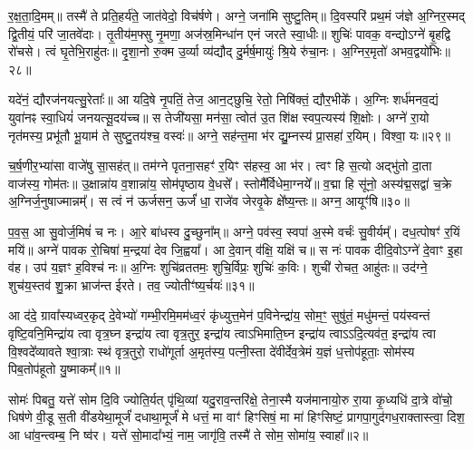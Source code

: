 र॒क्ष॒ता॒दि॒मम्॥ तस्मै॑ ते प्रति॒हर्य॑ते॒ जात॑वेदो॒ विच॑र्\mbox{}षणे। अग्ने॒ जना॑मि सुष्टु॒तिम्॥ दि॒वस्परि॑ प्रथ॒मं ज॑ज्ञे अ॒ग्निर॒स्मद् द्वि॒तीयं॒ परि॑ जा॒तवे॑दाः। तृ॒तीय॑म॒फ्सु नृ॒मणा॒ अज॑स्र॒मिन्धा॑न एनं जरते स्वा॒धीः॥ शुचिः॑ पावक॒ वन्द्यो\-ऽग्ने॑ बृ॒हद्वि रो॑चसे। त्वं घृ॒तेभि॒राहु॑तः॥ दृ॒शा॒नो रु॒क्म उ॒र्व्या व्य॑द्यौद् दु॒र्मर्\mbox{}ष॒मायुः॑ श्रि॒ये रु॑चा॒नः। अ॒ग्निर॒मृतो॑ अभव॒द्वयो॑भिः॥२८॥

यदे॑नं॒ द्यौरज॑नयत्सु॒रेताः᳚॥ आ यदि॒षे नृ॒पतिं॒ तेज॒ आन॒ट्छुचि॒ रेतो॒ निषि॑क्तं॒ द्यौर॒भीके᳚। अ॒ग्निः शर्ध॑मनव॒द्यं युवा॑नꣴ स्वा॒धियं॑ जनयत्सू॒दय॑च्च॥ स तेजी॑यसा॒ मन॑सा॒ त्वोत॑ उ॒त शि॑क्ष स्वप॒त्यस्य॑ शि॒क्षोः। अग्ने॑ रा॒यो नृत॑मस्य॒ प्रभू॑तौ भू॒याम॑ ते सुष्टु॒तय॑श्च॒ वस्वः॑॥ अग्ने॒ सह॑न्त॒मा भ॑र द्यु॒म्नस्य॑ प्रा॒सहा॑ र॒यिम्। विश्वा॒ यः॥२९॥

च॒र्\mbox{}ष॒णीर॒भ्या॑सा वाजे॑षु सा॒सह॑त्॥ तम॑ग्ने पृतना॒सहꣳ॑ र॒यिꣳ स॑हस्व॒ आ भ॑र। त्वꣳ हि स॒त्यो अद्भु॑तो दा॒ता वाज॑स्य॒ गोम॑तः॥ उ॒क्षान्ना॑य व॒शान्ना॑य॒ सोम॑पृष्ठाय वे॒धसे᳚। स्तोमै᳚र्विधेमा॒ग्नये᳚॥ व॒द्मा हि सू॑नो॒ अस्य॑द्म॒सद्वा॑ च॒क्रे अ॒ग्निर्ज॒नुषाज्मान्नम्᳚। स त्वं न॑ ऊर्जसन॒ ऊर्जं॑ धा॒ राजे॑व जेरवृ॒के क्षे᳚ष्य॒न्तः॥ अग्न॒ आयूꣳ॑षि॥३०॥

प॒व॒स॒ आ सु॒वोर्ज॒मिषं॑ च नः। आ॒रे बा॑धस्व दु॒च्छुना᳚म्॥ अग्ने॒ पव॑स्व॒ स्वपा॑ अ॒स्मे वर्चः॑ सु॒वीर्यम्᳚। दध॒त्पोषꣳ॑ र॒यिं मयि॑॥ अग्ने॑ पावक रो॒चिषा॑ म॒न्द्रया॑ देव जि॒ह्वया᳚। आ दे॒वान् व॑क्षि॒ यक्षि॑ च॥ स नः॑ पावक दीदि॒वो\-ऽग्ने॑ दे॒वाꣳ इ॒हा व॑ह। उप॑ य॒ज्ञꣳ ह॒विश्च॑ नः॥ अ॒ग्निः शुचि॑व्रततमः॒ शुचि॒र्विप्रः॒ शुचिः॑ क॒विः। शुची॑ रोचत॒ आहु॑तः॥ उद॑ग्ने॒ शुच॑य॒स्तव॑ शु॒क्रा भ्राज॑न्त ईरते। तव॒ ज्योतीꣳ॑ष्य॒र्चयः॑॥३१॥

{\anuvakamend[{पु॒रु॒नि॒ष्ठः पु॑र्वणीक भरा॒\-ऽभि वयो॑भि॒र्य आयूꣳ॑षि॒ विप्रः॒ शुचि॒श्चतु॑र्दश च॥14॥}]}

\setcounter{anuvakam}{0}
आ द॑दे॒ ग्रावा᳚स्यध्वर॒कृद् दे॒वेभ्यो॑ गम्भी॒रमि॒मम॑ध्व॒रं कृ॑ध्युत्त॒मेन॑ प॒विनेन्द्रा॑य॒ सोम॒ꣳ॒ सुषु॑तं॒ मधु॑मन्तं॒ पय॑स्वन्तं वृष्टि॒वनि॒मिन्द्रा॑य त्वा वृत्र॒घ्न इन्द्रा॑य त्वा वृत्र॒तुर॒ इन्द्रा॑य त्वा\-ऽभिमाति॒घ्न इन्द्रा॑य त्वा\-ऽ\-ऽदि॒त्यव॑त॒ इन्द्रा॑य त्वा वि॒श्वदे᳚व्यावते श्वा॒त्राः स्थ॑ वृत्र॒तुरो॒ राधो॑गूर्ता अ॒मृत॑स्य॒ पत्नी॒स्ता दे॑वीर्देव॒त्रेमं य॒ज्ञं ध॒त्तोप॑हूताः॒ सोम॑स्य पिब॒तोप॑हूतो यु॒ष्माकम्᳚॥१॥

सोमः॑ पिबतु॒ यत्ते॑ सोम दि॒वि ज्योति॒र्यत् पृ॑थि॒व्यां यदु॒राव॒न्तरि॑क्षे॒ तेना॒स्मै यज॑मानायो॒रु रा॒या कृ॒ध्यधि॑ दा॒त्रे वो॑चो॒ धिष॑णे वी॒डू स॒ती वी॑डयेथा॒मूर्जं॑ दधाथा॒मूर्जं॑ मे धत्तं॒ मा वाꣳ॑ हिꣳसिषं॒ मा मा॑ हिꣳसिष्टं॒ प्रागपा॒गुद॑गध॒राक्तास्त्वा॒ दिश॒ आ धा॑व॒न्त्वम्ब॒ नि ष्व॑र। यत्ते॑ सो॒मादा᳚भ्यं॒ नाम॒ जागृ॑वि॒ तस्मै॑ ते सोम॒ सोमा॑य॒ स्वाहा᳚॥२॥

